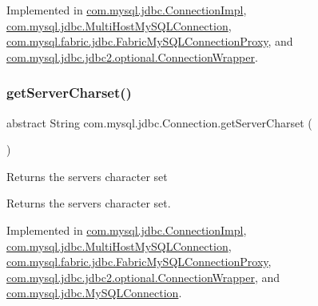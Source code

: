 Implemented in \mbox{\hyperlink{classcom_1_1mysql_1_1jdbc_1_1_connection_impl_ac6f97840677e30fabce87c044819e2c1}{com.\+mysql.\+jdbc.\+Connection\+Impl}}, \mbox{\hyperlink{classcom_1_1mysql_1_1jdbc_1_1_multi_host_my_s_q_l_connection_a940e7c80b671d477225bb90a97dd0f78}{com.\+mysql.\+jdbc.\+Multi\+Host\+My\+S\+Q\+L\+Connection}}, \mbox{\hyperlink{classcom_1_1mysql_1_1fabric_1_1jdbc_1_1_fabric_my_s_q_l_connection_proxy_abe3b0eb675021f5d0ab5aaf069bf0a58}{com.\+mysql.\+fabric.\+jdbc.\+Fabric\+My\+S\+Q\+L\+Connection\+Proxy}}, and \mbox{\hyperlink{classcom_1_1mysql_1_1jdbc_1_1jdbc2_1_1optional_1_1_connection_wrapper_a2426ec0276a9fe98270a545d0c272546}{com.\+mysql.\+jdbc.\+jdbc2.\+optional.\+Connection\+Wrapper}}.

\mbox{\label{interfacecom_1_1mysql_1_1jdbc_1_1_connection_a1831e47e0daa7d5a4b362219105a85ec}} 
\subsubsection{\texorpdfstring{get\+Server\+Charset()}{getServerCharset()}}
{\footnotesize\ttfamily abstract String com.\+mysql.\+jdbc.\+Connection.\+get\+Server\+Charset (\begin{DoxyParamCaption}{ }\end{DoxyParamCaption})\hspace{0.3cm}{\ttfamily [abstract]}}

Returns the server\textquotesingle{}s character set

\begin{DoxyReturn}{Returns}
the server\textquotesingle{}s character set. 
\end{DoxyReturn}


Implemented in \mbox{\hyperlink{classcom_1_1mysql_1_1jdbc_1_1_connection_impl_aec1bc6ca740ae9b75d6cad0f3126a276}{com.\+mysql.\+jdbc.\+Connection\+Impl}}, \mbox{\hyperlink{classcom_1_1mysql_1_1jdbc_1_1_multi_host_my_s_q_l_connection_ade6eec72969b91ca518b7750d0af4539}{com.\+mysql.\+jdbc.\+Multi\+Host\+My\+S\+Q\+L\+Connection}}, \mbox{\hyperlink{classcom_1_1mysql_1_1fabric_1_1jdbc_1_1_fabric_my_s_q_l_connection_proxy_a05da3e56f23e090e7a4048dcd59d1454}{com.\+mysql.\+fabric.\+jdbc.\+Fabric\+My\+S\+Q\+L\+Connection\+Proxy}}, \mbox{\hyperlink{classcom_1_1mysql_1_1jdbc_1_1jdbc2_1_1optional_1_1_connection_wrapper_a1ef2f18c2e33a44c97b764a50fda2da4}{com.\+mysql.\+jdbc.\+jdbc2.\+optional.\+Connection\+Wrapper}}, and \mbox{\hyperlink{interfacecom_1_1mysql_1_1jdbc_1_1_my_s_q_l_connection_a4f921d9cf354764fd1241cd56c0abecb}{com.\+mysql.\+jdbc.\+My\+S\+Q\+L\+Connection}}.

